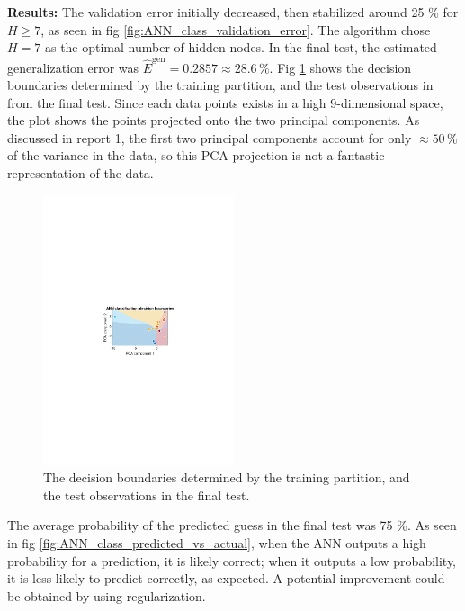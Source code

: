 \begin{multicols}{2}
\textbf{Results:} The validation error initially decreased, then stabilized around 25 \% for $H \geq 7$, as seen in fig \ref{fig:ANN_class_validation_error}. The algorithm chose $H=7$ as the optimal number of hidden nodes. In the final test, the estimated generalization error was $\hat{E}^{\text{gen}} = 0.2857 \approx 28.6 \, \%$. Fig \ref{fig:ANN_class_decision_boundaries} shows the decision boundaries determined by the training partition, and the test observations in from the final test. Since each data points exists in a high 9-dimensional space, the plot shows the points projected onto the two principal components. As discussed in report 1, the first two principal components account for only $\approx 50 \, \%$ of the variance in the data, so this PCA projection is not a fantastic representation of the data.

\begin{figure}[H]
    \centering
    \includegraphics[width=0.50\textwidth]{fig/classification/ANN_class_decision_boundaries.pdf}
    \caption{The decision boundaries determined by the training partition, and the test observations in the final test.}
    \label{fig:ANN_class_decision_boundaries}
\end{figure}
\end{multicols}

The average probability of the predicted guess in the final test was 75 \%. As seen in fig \ref{fig:ANN_class_predicted_vs_actual}, when the ANN outputs a high probability for a prediction, it is likely correct; when it outputs a low probability, it is less likely to predict correctly, as expected. A potential improvement could be obtained by using regularization. 

